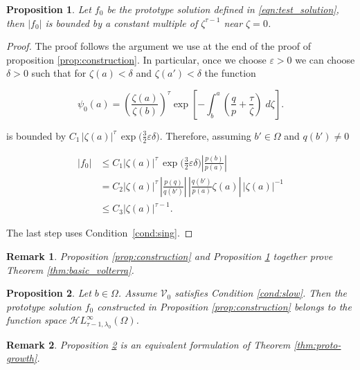 \documentclass{article}
\theoremstyle{plain}
\newtheorem{prop}{Proposition}
\newtheorem{rmk}{Remark}
\newcommand{\singexp}[2]{\mathcal{H}L^\infty_{#1, #2}}
\newcommand{\hardpart}{\mathcal{V}_0}
\newcommand{\domain}{\Omega}
\begin{document}
\begin{prop}\label{prop:asymptotic at zero}
    Let $f_0$ be the prototype solution defined in \eqref{eqn:test_solution}, then $|f_0|$ is bounded by a constant multiple of $\zeta^{\tau-1}$ near $\zeta=0$. 
\end{prop}

\begin{proof}
The proof follows the argument we use at the end of the proof of proposition \ref{prop:construction}. In particular, once we choose $\varepsilon>0$ we can choose $\delta>0$ such that for $\zeta(a)<\delta$ and $\zeta(a')<\delta$ the function

\[ \psi_0(a) = \left(\frac{\zeta(a)}{\zeta(b)}\right)^\tau \exp\left[-\int_b^a \left( \frac{q}{p} + \frac{\tau}{\zeta} \right)\;d\zeta\right]. \]

is bounded by $C_1 \, |\zeta(a)|^\tau \, \exp\big(\tfrac{3}{2}\varepsilon\delta\big)$. Therefore, assuming $b'\in\Omega$ and $q(b') \neq 0$

\begin{align*}
|f_0| &  \leq C_1 |\zeta(a)|^\tau \, \exp\big(\tfrac{3}{2}\varepsilon\delta\big) \left\vert  \frac{p(b)}{p(a)}\right\vert \\
& =  C_2 |\zeta(a)|^\tau \, \left\vert\frac{p(q)}{q(b')} \right\vert \, \left\vert \frac{q(b')}{p(a)} \zeta(a)\right\vert \, |\zeta(a)|^{-1} \\
&  \leq C_3 |\zeta(a)|^{\tau-1}.
\end{align*}

The last step uses Condition~\eqref{cond:sing}. 
\end{proof}

\begin{rmk}
   {\em Proposition \ref{prop:construction}} and {\em Proposition \ref{prop:asymptotic at zero}} together prove {\em Theorem \ref{thm:basic_volterra}}. 
\end{rmk}


\begin{prop}\label{prop:asymptotic at infinity}
    Let $b\in\domain$. Assume $\hardpart$ satisfies {\em Condition} \eqref{cond:slow}. Then the prototype solution $f_0$ constructed in {\em Proposition \ref{prop:construction}} belongs to the function space $\singexp{\tau-1}{\lambda_0}(\domain)$.
\end{prop}

\begin{rmk}
    {\em Proposition \ref{prop:asymptotic at infinity}} is an equivalent formulation of {\em Theorem \ref{thm:proto-growth}}.
\end{rmk}
\end{document}
